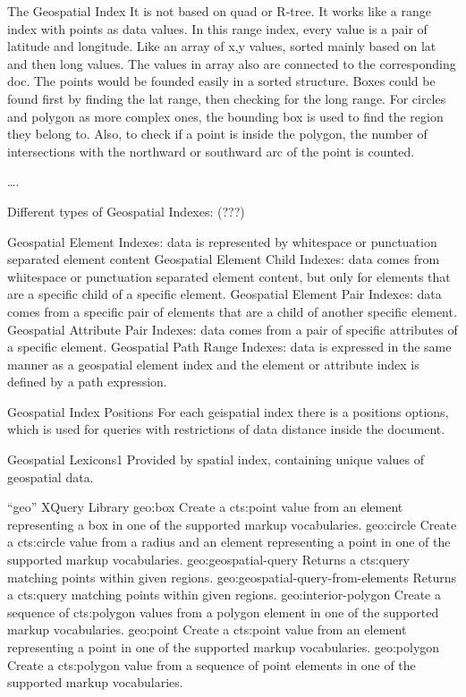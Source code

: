 \documentclass[a4paper,12pt]{article}
\begin{document}
The Geospatial Index
It is not based on quad or R-tree. It works like a range index with points as data values. In this range index, every value is a pair of latitude and longitude. Like an array of x,y values, sorted mainly based on lat and then long values. The values in array also are connected to the corresponding doc.
The points would be founded easily in a sorted structure. Boxes could be found first by finding the lat range, then checking for the long range. For circles and polygon as more complex ones, the bounding box is used to find the region they belong to. Also, to check if a point is inside the polygon, the number of intersections with the northward or southward arc of the point is counted. 

…. 

Different types of Geospatial Indexes: (???)

 Geospatial Element Indexes: data is represented by whitespace or punctuation separated element content 
 Geospatial Element Child Indexes: data comes from whitespace or punctuation separated element content, but only for elements that are a specific child of a specific element.
 Geospatial Element Pair Indexes: data comes from a specific pair of elements that are a child of another specific element.
 Geospatial Attribute Pair Indexes: data comes from a pair of specific attributes of a specific element.
 Geospatial Path Range Indexes: data is expressed in the same manner as a geospatial element index and the element or attribute index is defined by a path expression.


Geospatial Index Positions
	For each geispatial index there is a positions options, which is used for queries with restrictions of data distance inside the document.

Geospatial Lexicons1
Provided by spatial index, containing unique values of  geospatial data. 

“geo” XQuery Library
geo:box
Create a cts:point value from an element representing a box in one of the supported markup vocabularies.
geo:circle
Create a cts:circle value from a radius and an element representing a point in one of the supported markup vocabularies.
geo:geospatial-query
Returns a cts:query matching points within given regions.
geo:geospatial-query-from-elements
Returns a cts:query matching points within given regions.
geo:interior-polygon
Create a sequence of cts:polygon values from a polygon element in one of the supported markup vocabularies.
geo:point
Create a cts:point value from an element representing a point in one of the supported markup vocabularies.
geo:polygon
Create a cts:polygon value from a sequence of point elements in one of the supported markup vocabularies.
\end{document}
